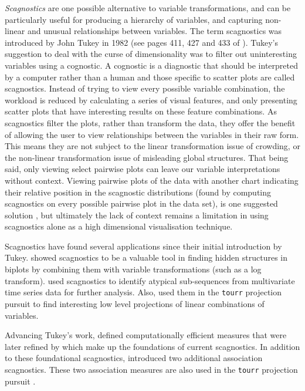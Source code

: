 \emph{Scagnostics} are one possible alternative to variable transformations, and can be particularly useful for producing a hierarchy of variables, and capturing non-linear and unusual relationships between variables. The term scagnostics was introduced by John Tukey in 1982 (see pages 411, 427 and 433 of \citet{tukey}). Tukey's suggestion to deal with the curse of dimensionality was to filter out uninteresting variables using a cognostic. A cognostic is a diagnostic that should be interpreted by a computer rather than a human and those specific to scatter plots are called scagnostics. Instead of trying to view every possible variable combination, the workload is reduced by calculating a series of visual features, and only presenting scatter plots that have interesting results on these feature combinations. As scagnostics filter the plots, rather than transform the data, they offer the benefit of allowing the user to view relationships between the variables in their raw form. This means they are not subject to the linear transformation issue of crowding, or the non-linear transformation issue of misleading global structures. That being said, only viewing select pairwise plots can leave our variable interpretations without context. Viewing pairwise plots of the data with another chart indicating their relative position in the scagnostic distributions (found by computing scagnostics on every possible pairwise plot in the data set), is one suggested solution \citep{scagexplorer}, but ultimately the lack of context remains a limitation in using scagnostics alone as a high dimensional visualisation technique.

Scagnostics have found several applications since their initial introduction by Tukey. \citet{hidscags} showed scagnostics to be a valuable tool in finding hidden structures in biplots by combining them with variable transformations (such as a log transform). \citet{timeseer} used scagnostics to identify atypical sub-sequences from multivariate time series data for further analysis. Also, \citet{tourrpp} used them in the \texttt{tourr} projection pursuit to find interesting low level projections of linear combinations of variables.

Advancing Tukey's work, \citet{scag} defined computationally efficient measures that were later refined by \citet{scagdist} which make up the foundations of current scagnostics. In addition to these foundational scagnostics, \citet{Grimm} introduced two additional association scagnostics. These two association measures are also used in the \texttt{tourr} projection pursuit \citep{tourrpp}.

